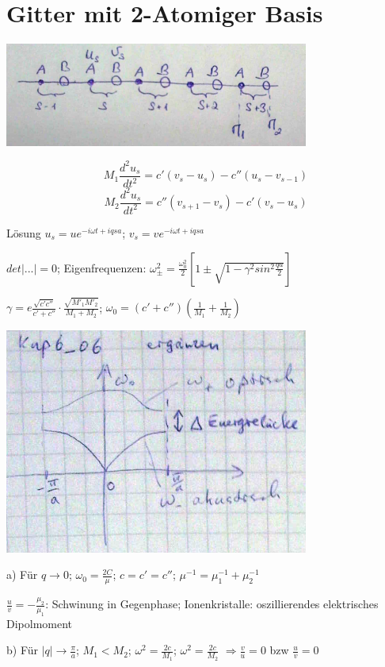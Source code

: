\section{Gitter mit 2-Atomiger Basis}

\includegraphics[width=0.75\textwidth]{kap06_05.png}

\[ M_1\frac{d^2 u_s}{dt^2} = c'(v_s-u_s)-c''(u_s-v_{s-1})\]
\[ M_2\frac{d^2 u_s}{dt^2} = c''(v_{s+1}-v_s)-c'(v_s-u_s)\]

Lösung \(u_s=ue^{-i\omega t + iqsa}\); \(v_s=ve^{-i\omega t + iqsa}\)



\(det|...|=0\); Eigenfrequenzen: \(\omega^2_{\pm} = \frac{\omega^2_0}{2}\left[1\pm \sqrt{1-\gamma^2 sin^2\frac{qa}{2}} \right]\)


\(\gamma = e \frac{\sqrt{c'c''}}{c'+c''}\cdot \frac{\sqrt{M'_1 M'_2}}{M_1+M_2}\); \(\omega_0 = (c'+c'')(\frac{1}{M_1}+\frac{1}{M_2})\)

\includegraphics[width=0.75\textwidth]{kap06_06.png}


a) Für \(q\rightarrow 0\); \(\omega_0=\frac{2C}{\mu}\); \(c=c'=c''\); \(\mu^{-1}=\mu^{-1}_1+\mu^{-1}_2\)

\(\frac{u}{v}= -\frac{\mu_2}{\mu_1}\): Schwinung in Gegenphase; Ionenkristalle: oszillierendes elektrisches Dipolmoment

b) Für \(|q|\rightarrow \frac{\pi}{a}\); \(M_1<M_2\); \(\omega^2=\frac{2c}{M_1}\); \(\omega^2=\frac{2c}{M_2}\) \(\Rightarrow \frac{v}{u}=0\) bzw \(\frac{u}{v}=0\)

